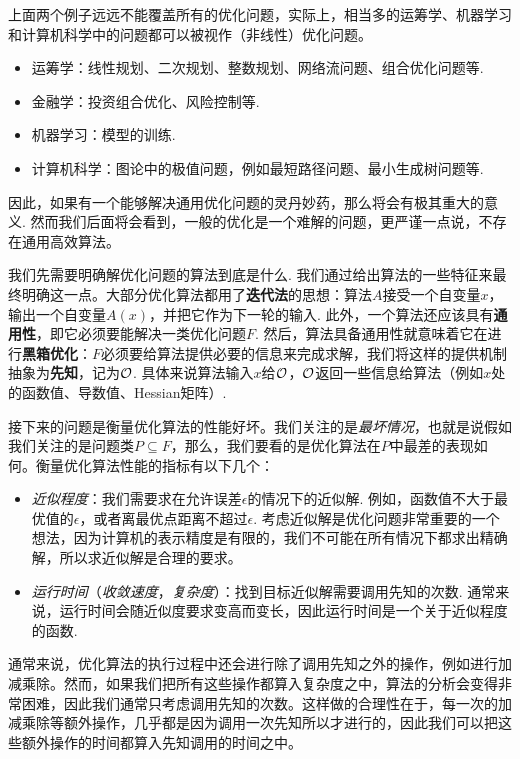 上面两个例子远远不能覆盖所有的优化问题，实际上，相当多的运筹学、机器学习和计算机科学中的问题都可以被视作（非线性）优化问题。
\begin{itemize}
    \item 运筹学：线性规划、二次规划、整数规划、网络流问题、组合优化问题等.
    \item 金融学：投资组合优化、风险控制等.
    \item 机器学习：模型的训练.
    \item 计算机科学：图论中的极值问题，例如最短路径问题、最小生成树问题等.
\end{itemize}
因此，如果有一个能够解决通用优化问题的灵丹妙药，那么将会有极其重大的意义. 然而我们后面将会看到，一般的优化是一个难解的问题，更严谨一点说，不存在通用高效算法。

我们先需要明确解优化问题的算法到底是什么. 我们通过给出算法的一些特征来最终明确这一点。大部分优化算法都用了\textbf{迭代法}的思想：算法$A$接受一个自变量$x$，输出一个自变量$A(x)$，并把它作为下一轮的输入. 此外，一个算法还应该具有\textbf{通用性}，即它必须要能解决一类优化问题$F$. 然后，算法具备通用性就意味着它在进行\textbf{黑箱优化}：$F$必须要给算法提供必要的信息来完成求解，我们将这样的提供机制抽象为\textbf{先知}，记为$\mathcal{O}$. 具体来说算法输入$x$给$\mathcal{O}$，$\mathcal{O}$返回一些信息给算法（例如$x$处的函数值、导数值、Hessian矩阵）.

接下来的问题是衡量优化算法的性能好坏。我们关注的是\emph{最坏情况}，也就是说假如我们关注的是问题类$P\subseteq F$，那么，我们要看的是优化算法在$P$中最差的表现如何。衡量优化算法性能的指标有以下几个：

\begin{itemize}
    \item \emph{近似程度}：我们需要求在允许误差$\epsilon$的情况下的近似解. 例如，函数值不大于最优值的$\epsilon$，或者离最优点距离不超过$\epsilon$. 考虑近似解是优化问题非常重要的一个想法，因为计算机的表示精度是有限的，我们不可能在所有情况下都求出精确解，所以求近似解是合理的要求。
    \item \emph{运行时间}（\emph{收敛速度}，\emph{复杂度}）：找到目标近似解需要调用先知的次数. 通常来说，运行时间会随近似度要求变高而变长，因此运行时间是一个关于近似程度的函数.
\end{itemize}

\begin{remark}
    通常来说，优化算法的执行过程中还会进行除了调用先知之外的操作，例如进行加减乘除。然而，如果我们把所有这些操作都算入复杂度之中，算法的分析会变得非常困难，因此我们通常只考虑调用先知的次数。这样做的合理性在于，每一次的加减乘除等额外操作，几乎都是因为调用一次先知所以才进行的，因此我们可以把这些额外操作的时间都算入先知调用的时间之中。
\end{remark}

